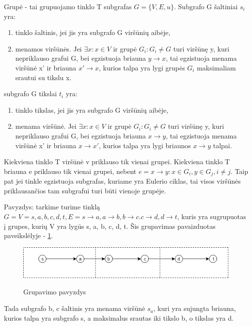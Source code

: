 Grupė - tai grupuojamo tinklo T subgrafas $G= \{V, E, u\}$. Subgrafo G šaltiniai $s_i$ yra:
\begin{enumerate}
	\item  tinklo šaltinis, jei jis yra subgrafo G viršūnių aibėje,
	\item  menamos viršūnės. Jei $\exists x: x \in V$ ir grupė $G_i : G_i \neq G$ turi viršūnę y, kuri nepriklauso grafui G, bei egzistuoja briauna $y \rightarrow x$, tai egzistuoja menama viršūnė x' ir briauna $x' \rightarrow x$, kurios talpa yra lygi grupės $G_i$ maksimaliam srautui su tikslu x.
\end{enumerate}
subgrafo G tikslai $t_i$ yra:
\begin{enumerate}
	\item  tinklo tikslas, jei jis yra subgrafo G viršūnių aibėje,
	\item  menama viršūnė. Jei $\exists x: x \in V$ ir grupė $G_i : G_i \neq G$ turi viršūnę y, kuri nepriklauso grafui G, bei egzistuoja briauna $x \rightarrow y$, tai egzistuoja menama viršūnė x' ir briauna $x \rightarrow x'$, kurios talpa yra lygi briaunos $x \rightarrow y$ talpai.
\end{enumerate}

Kiekviena tinklo T viršūnė v priklauso tik vienai grupei. Kiekviena tinklo T briauna e priklauso tik vienai grupei, nebent $e = x \rightarrow y : x \in G_i, y \in G_j, i \neq j$. Taip pat jei tinkle egzistuoja subgrafas, kuriame yra Eulerio ciklas, tai visos viršūnės priklausančios tam subgrafui turi būti vienoje grupėje.

Pavyzdys: tarkime turime tinklą $G = {V={s, a, b, c, d, t}, E={s  \rightarrow a, a \rightarrow b, b \rightarrow c. c \rightarrow d, d \rightarrow t}}$, kuris yra sugrupuotas į grupes, kurių V yra lygūs {s, a}, {b, c}, {d, t}. Šis grupavimas pavaizduotas paveikslėlyje - \ref{fig:grupavimas}.
\begin{figure}[h]
	\caption{Grupavimo pavyzdys}
	\centering
	\includegraphics[width=\textwidth]{img/grupes_pavyzdziui.png}
	\label{fig:grupavimas}
\end{figure}

Tada subgrafo {b, c} šaltinis yra menama viršūnė $s_a$, kuri yra sujungta briauna, kurios talpa yra subgrafo {s, a} maksimalus srautas iki tikslo b, o tikslas yra d.